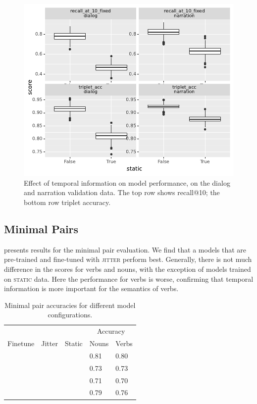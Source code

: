 \begin{figure}[htb]
  \centering
  \includegraphics[width=\columnwidth]{results/ablations/static.pdf}
  \caption{Effect of temporal information on model performance, on the dialog
          and narration validation data. The top row shows recall@10;
          the bottom row triplet accuracy.}
  \label{fig:static}
\end{figure}


\subsection{Minimal Pairs}
\label{sec:minimal-pairs}


 presents results for the minimal pair 
evaluation. We find that a models that are 
pre-trained and fine-tuned with \textsc{jitter} perform best. Generally, there 
is not much difference in the scores for verbs and nouns, with the exception of 
models trained on \textsc{static} data. Here the performance for verbs is 
worse, confirming that temporal information is more important for the semantics 
of verbs.
\begin{table}[ht]
	\centering
	\begin{tabular}{lllll}
		\toprule
		& & & \multicolumn{2}{c}{Accuracy} \\
		Finetune & Jitter & Static & Nouns & Verbs \\
		\midrule
		\checkmark & \checkmark &  & 0.81 & 0.80 \\
		\checkmark &  &  & 0.73 & 0.73  \\
		 & \checkmark &  & 0.71 & 0.70 \\
		\checkmark & \checkmark &  \checkmark & 0.79 & 0.76 \\
		\bottomrule
	\end{tabular}
	\caption{Minimal pair accuracies for different model configurations.}
	\label{tab:minimal_pair_results}
\end{table}

